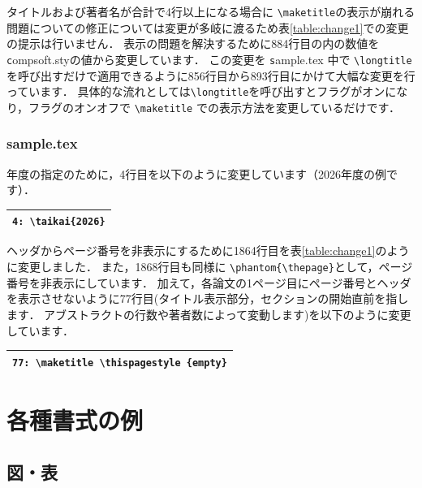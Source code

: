 \documentclass[T,J]{fose} %
\begin{document}
タイトルおよび著者名が合計で4行以上になる場合に \verb|\maketitle|の表示が崩れる問題についての修正については変更が多岐に渡るため表\ref{table:change1}での変更の提示は行いません．
表示の問題を解決するために884行目の内の数値を {\texttt compsoft.sty}の値から変更しています．
この変更を {\texttt sample.tex} 中で \verb|\longtitle| を呼び出すだけで適用できるように856行目から893行目にかけて大幅な変更を行っています．
具体的な流れとしては\verb|\longtitle|を呼び出すとフラグがオンになり，フラグのオンオフで \verb|\maketitle| での表示方法を変更しているだけです．

\subsubsection*{sample.tex}
年度の指定のために，4行目を以下のように変更しています（2026年度の例です）．

\begin{tabularx}{23zw}{|X|}
	\hline
	\verb|4: \taikai{2026}|
	\\
	\hline
\end{tabularx}

ヘッダからページ番号を非表示にするために1864行目を表\ref{table:change1}のように変更しました．
また，1868行目も同様に \verb|\phantom{\thepage}|として，ページ番号を非表示にしています．
加えて，各論文の1ページ目にページ番号とヘッダを表示させないように77行目(タイトル表示部分，セクションの開始直前を指します．
アブストラクトの行数や著者数によって変動します)を以下のように変更しています．\\

\begin{tabularx}{23zw}{|X|}
	\hline
	\verb|77: \maketitle \thispagestyle {empty}|
	\\
	\hline
\end{tabularx}


\section{各種書式の例}

\subsection{図・表}
\end{document}
